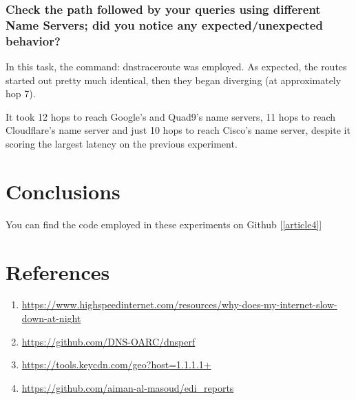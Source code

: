 \documentclass[a4paper,10pt]{article}
\begin{document}
\subsubsection{Check the path followed by your queries using different Name Servers; did you
notice any expected/unexpected behavior?}

In this task, the command: dnstraceroute was employed. As expected, the routes started out pretty much identical, then they began diverging (at approximately hop 7). 

It took 12 hops to reach Google's and Quad9's name servers, 11 hops to reach Cloudflare's name server and just 10 hops to reach Cisco's name server, despite it scoring the largest latency on the previous experiment.


\clearpage

\section{Conclusions}

You can find the code employed in these experiments on Github [\ref{article4}] 


\section{References}

\begin{enumerate}

\item \label{article1}  \url{https://www.highspeedinternet.com/resources/why-does-my-internet-slow-down-at-night} 
\item \label{article2}  \url{https://github.com/DNS-OARC/dnsperf} 
\item \label{article3}  \url{https://tools.keycdn.com/geo?host=1.1.1.1+} 
\item \label{article4}  \url{https://github.com/aiman-al-masoud/edi_reports} 

\end{enumerate}
\end{document}

